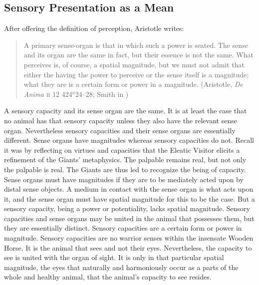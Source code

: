 
\subsection{Sensory Presentation as a Mean} %
\label{sub:sensory_presentation_as_a_mean}

After offering the definition of perception, Aristotle writes:
\begin{quote}
	A primary sense-organ is that in which such a power is seated. The sense and its organ are the same in fact, but their essence is not the same. What perceives is, of course, a spatial magnitude, but we must not admit that either the having the power to perceive or the sense itself is a magnitude; what they are is a certain form or power in a magnitude. (Aristotle, \emph{De Anima} \textsc{ii} 12 424\( ^{a} \)24--28; Smith in \citealt[43]{Barnes:1984uq})
\end{quote}
A sensory capacity and its sense organ are the same. It is at least the case that no animal has that sensory capacity unless they also have the relevant sense organ. Nevertheless sensory capacities and their sense organs are essentially different. Sense organs have magnitudes whereas sensory capacities do not. Recall it was by reflecting on virtues and capacities that the Eleatic Visitor elicits a refinement of the Giants' metaphysics. The palpable remains real, but not only the palpable is real. The Giants are thus led to recognize the being of capacity. Sense organs must have magnitudes if they are to be mediately acted upon by distal sense objects. A medium in contact with the sense organ is what acts upon it, and the sense organ must have spatial magnitude for this to be the case. But a sensory capacity, being a power or potentiality, lacks spatial magnitude. Sensory capacities and sense organs may be united in the animal that possesses them, but they are essentially distinct. Sensory capacities are a certain form or power in magnitude. Sensory capacities are no warrior senses within the insensate Wooden Horse. It is the animal that sees and not their eyes. Nevertheless, the capacity to see is united with the organ of sight. It is only in that particular spatial magnitude, the eyes that naturally and harmoniously occur as a parts of the whole and healthy animal, that the animal's capacity to see resides.

